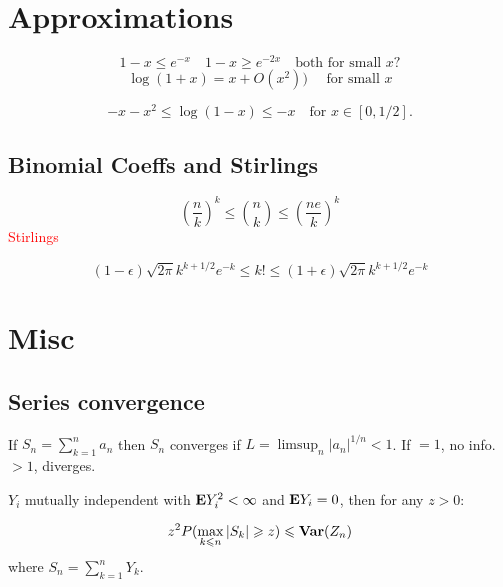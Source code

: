 \documentclass{article}
\newcommand\myworries[1]{\textcolor{red}{#1}}
\begin{document}
\begin{example}
    
\end{example}



\newpage 
\section{Approximations}

$$1-x \leq e^{-x} \quad 1-x\geq e^{-2x} \quad \text{both for small } x?$$  
$$\log(1+x) = x + O(x^2)) \quad \text{ for small } x$$

$$-x-x^2 \leq \log(1-x) \leq -x \quad \text{for } x\in [0,1/2].$$



\subsection{Binomial Coeffs and Stirlings}
$$(\frac{n}{k})^k \leq \binom{n}{k} \leq (\frac{ne}{k})^k $$
\myworries{Stirlings}
\begin{theorem}[Stirlings]
$$(1-\epsilon) \sqrt{2\pi} k^{k+1/2}e^{-k}\leq k! \leq (1+\epsilon) \sqrt{2\pi} k^{k+1/2}e^{-k}$$
\end{theorem}




\section{Misc}
\begin{definition}[Metric]
\end{definition}

\subsection{Series convergence}
\begin{theorem}
If $S_n = \sum_{k=1}^n a_n$ then $S_n$ converges if $L = \limsup_n |a_n|^{1/n} <1$. If $=1$, no info. $>1$, diverges. 
\end{theorem}


\begin{theorem}
$Y_i$ mutually independent with $\mathbf{E} Y_i^2 <\infty$ and $\mathbf{E} Y_i = 0$, then for any $z>0$:

$$z^2 P(\max_{k\leqslant n} |S_k| \geqslant z) \leqslant \mathbf{Var} (Z_n)$$
where $S_n = \sum_{k=1}^n Y_k$.
\end{theorem}
\newpage
\end{document}
